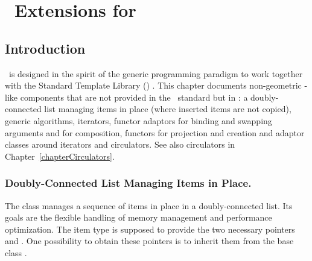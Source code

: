 
\chapter{\stl\ Extensions for \cgal}
\label{chapterDataStructures_ref}\label{chapterStlExtensions_ref}



\section*{Introduction}

\cgal\ is designed in the spirit of the generic programming paradigm
to work together with the Standard Template Library (\stl)
\cite{ansi-is14882,a-gps-98}. This chapter documents non-geometric
\stl-like components that are not provided in the \stl\ standard but
in \cgal: a doubly-connected list managing items in place (where
inserted items are not copied), generic algorithms, iterators, functor
adaptors for binding and swapping arguments and for composition,
functors for projection and creation and adaptor classes around
iterators and circulators. See also circulators in
Chapter~\ref{chapterCirculators}.

\subsection*{Doubly-Connected List Managing Items in Place.}

The class  manages a
sequence of items in place in a doubly-connected list. Its goals are
the flexible handling of memory management and performance
optimization. The item type is supposed to provide the two necessary
pointers  and . One possibility
to obtain these pointers is to inherit them from the base class
.

